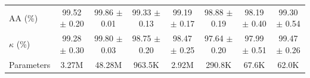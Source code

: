 \begin{table}[htbp]
{\begin{tabular}{l c c c c c c c}
    AA (\%) & \textcolor{tgblue}{99.52 $\pm$ 0.20} & \textcolor{tgteal}{99.86 $\pm$ 0.01} & \textcolor{tgred}{99.33 $\pm$ 0.13} & 99.19 $\pm$ 0.17 & 98.88 $\pm$ 0.19 & 98.19 $\pm$ 0.40 & 99.30 $\pm$ 0.54 \\
    $\kappa$ (\%) & \textcolor{tgred}{99.28 $\pm$ 0.30} & \textcolor{tgteal}{99.80 $\pm$ 0.03} & 98.75 $\pm$ 0.20 & 98.47 $\pm$ 0.25 & 97.64 $\pm$ 0.20 & 97.99 $\pm$ 0.51 & \textcolor{tgblue}{99.47 $\pm$ 0.26} \\
    \midrule
    Parameters & 3.27M & 48.28M & 963.5K & 2.92M & 290.8K & 67.6K & 62.0K \\
    \bottomrule
  \end{tabular}%
  }
\end{table}
